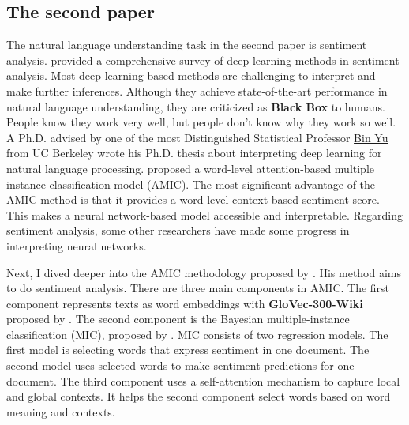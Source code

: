 \documentclass[aoas]{imsart}
\numberwithin{equation}{section}
\theoremstyle{plain}
\theoremstyle{remark}
\begin{document}
\subsection{The second paper}
The natural language understanding task in the second paper is sentiment analysis. \cite{DBLP:journals/corr/abs-1801-07883} provided a comprehensive survey of deep learning methods in sentiment analysis. Most deep-learning-based methods are challenging to interpret and make further inferences. Although they achieve state-of-the-art performance in natural language understanding, they are criticized as \textbf{Black Box} to humans. People know they work very well, but people don't know why they work so well. A Ph.D. \cite{Murdoch2019-uy} advised by one of the most Distinguished Statistical Professor \href{https://binyu.stat.berkeley.edu/}{Bin Yu} from UC Berkeley wrote his Ph.D. thesis about interpreting deep learning for natural language processing. \cite{chenyu} proposed a word-level attention-based multiple instance classification model (AMIC). The most significant advantage of the AMIC method is that it provides a word-level context-based sentiment score. This makes a neural network-based model accessible and interpretable. Regarding sentiment analysis, some other researchers have made some progress in interpreting neural networks. 

Next, I dived deeper into the AMIC methodology proposed by \cite{chenyu}. His method aims to do sentiment analysis. There are three main components in AMIC. The first component represents texts as word embeddings with \textbf{GloVec-300-Wiki} proposed by \cite{pennington-etal-2014-glove}. The second component is the Bayesian multiple-instance classification (MIC), proposed by \cite{Xiong2021-zt}. MIC consists of two regression models. The first model is selecting words that express sentiment in one document. The second model uses selected words to make sentiment predictions for one document. The third component uses a self-attention mechanism to capture local and global contexts. It helps the second component select words based on word meaning and contexts.
\end{document}
